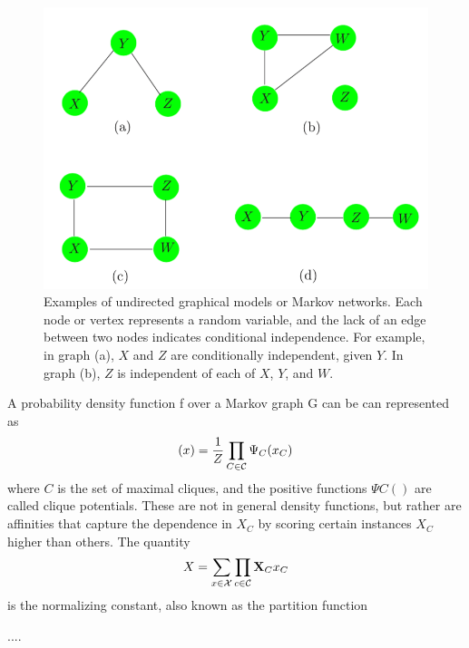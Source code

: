 \begin{figure}
\centering
\includegraphics[scale=0.45]{img/graphs}
\caption{Examples of undirected graphical models or Markov networks. Each node or vertex represents a random variable, and the lack of an edge between two nodes indicates conditional independence. For example, in graph (a), $X$ and $Z$ are conditionally independent, given $Y$. In graph (b), $Z$ is independent of each of $X$, $Y$, and $W$.}
\label{graphs}
\end{figure}
A probability density function f over a Markov graph G can be can represented as
\begin{equation}
(x) = \frac{1}{Z} \prod_{C \in \CMcal{C}} \Psi_C (x_C)
\end{equation}
where $C$ is the set of maximal cliques, and the positive functions $\Psi C()$ are called clique potentials.  These are not in general density functions, but rather are affinities that capture the dependence in $X_C$ by scoring certain instances $X_C$ higher than others. The quantity
\begin{equation}
X = \sum_{x \in \CMcal{X}} \prod_{c \in \CMcal{C}} \X_C{x_C}
\end{equation}
is the normalizing constant, also known as the partition function

....
